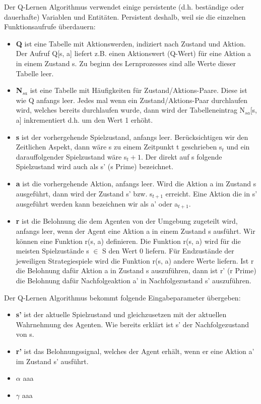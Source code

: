 Der Q-Lernen Algorithmus verwendet einige persistente (d.h. beständige oder dauerhafte) Variablen und Entitäten. Persistent deshalb, weil sie die einzelnen Funktionsaufrufe überdauern: 
\begin{itemize}

\item \textbf{Q} ist eine Tabelle mit Aktionswerden, indiziert nach Zustand und Aktion. Der Aufruf Q[s, a] liefert z.B. einen Aktionswert (Q-Wert) für eine Aktion a in einem Zustand s. Zu beginn des Lernprozesses sind alle Werte dieser Tabelle leer.

\item \textbf{N$_{sa}$} ist eine Tabelle mit Häufigkeiten für Zustand/Aktions-Paare.  Diese ist wie Q anfangs leer. Jedes mal wenn ein Zustand/Aktions-Paar durchlaufen wird, welches bereits durchlaufen wurde, dann wird der Tabelleneintrag N$_{sa}$[s, a] inkrementiert d.h. um den Wert 1 erhöht.

\item \textbf{s} ist der vorhergehende Spielzustand, anfangs leer. Berücksichtigen wir den Zeitlichen Aspekt, dann wäre s zu einem Zeitpunkt t geschrieben s${_t}$ und ein darauffolgender Spielzustand wäre s${_t+1}$. Der direkt auf s folgende Spielzustand wird auch als s' (s Prime) bezeichnet.

\item \textbf{a} ist die vorhergehende Aktion, anfangs leer. Wird die Aktion a im Zustand s ausgeführt, dann wird der Zustand s' bzw. s$_{t+1}$ erreicht. Eine Aktion die in s' ausgeführt werden kann bezeichnen wir als a' oder a$_{t+1}$.

\item \textbf{r} ist die Belohnung die dem Agenten von der Umgebung zugeteilt wird, anfangs leer, wenn der Agent eine Aktion a in einem Zustand s ausführt. Wir können eine Funktion r(s, a) definieren. Die Funktion r(s, a) wird für die meisten Spielzustände s $\in$ S den Wert 0 liefern. Für Endzustände der jeweiligen Strategiespiele wird die Funktion r(s, a) andere Werte liefern. Ist r die Belohnung dafür Aktion a in Zustand s auszuführen, dann ist r' (r Prime) die Belohnung dafür Nachfolgeaktion a' in Nachfolgezustand s' auszuführen.
\end{itemize}

Der Q-Lernen Algorithmus bekommt folgende Eingabeparameter übergeben:
\begin{itemize}
\item \textbf{s'} ist der aktuelle Spielzustand und gleichzusetzen mit der aktuellen Wahrnehmung des Agenten. Wie bereits erklärt ist s' der Nachfolgezustand von s.

\item \textbf{r'} ist das Belohnungssignal, welches der Agent erhält, wenn er eine Aktion a' im Zustand s' ausführt. 

\item \textbf{$\alpha$} aaa

\item \textbf{$\gamma$} aaa
\end{itemize}

